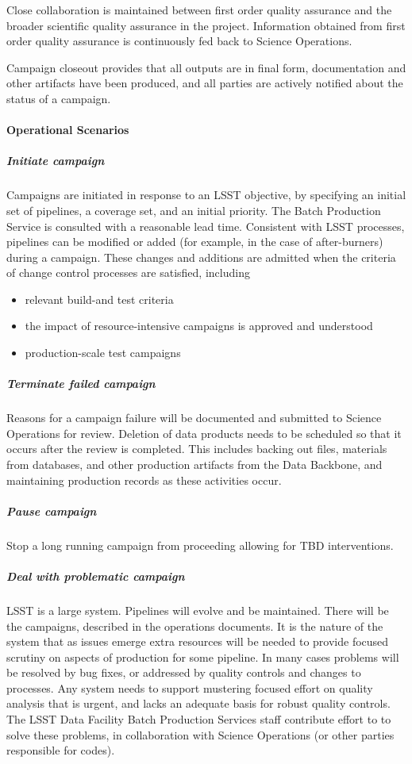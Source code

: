 Close collaboration is maintained between first order quality assurance and the
broader scientific quality assurance in the project. Information obtained from
first order quality assurance is continuously fed back to Science Operations.

Campaign closeout provides that all outputs are in final form, documentation and
other artifacts have been produced, and all parties are actively notified about
the status of a campaign.

\paragraph{Operational Scenarios}

\subparagraph{Initiate campaign}

Campaigns are initiated in response to an LSST objective, by specifying an
initial set of pipelines, a coverage set, and an initial priority. The Batch
Production Service is consulted with a reasonable lead time. Consistent with
LSST processes, pipelines can be modified or added (for example, in the case of
after-burners) during a campaign. These changes and additions are admitted when
the criteria of change control processes are satisfied, including

\begin{itemize}

\item relevant build-and test criteria

\item the impact of resource-intensive campaigns is approved and understood

\item production-scale test campaigns

\end{itemize}

\subparagraph{Terminate failed campaign}
Reasons for a campaign failure will be documented and submitted to Science
Operations for review. Deletion of data products needs to be scheduled so that
it occurs after the review is completed. This includes backing out files, materials
from databases, and other production artifacts from the Data Backbone, and
maintaining production records as these activities occur.

\subparagraph{Pause campaign}
Stop a long running campaign from proceeding allowing for TBD interventions.

\subparagraph{Deal with problematic campaign}
LSST is a large system. Pipelines will evolve and be maintained. There will be
the campaigns, described in the operations documents. It is the nature of the
system that as issues emerge extra resources will be needed to provide focused
scrutiny on aspects of production for some pipeline. In many cases problems will
be resolved by bug fixes, or addressed by quality controls and changes to
processes. Any system needs to support mustering focused effort on quality
analysis that is urgent, and lacks an adequate basis for robust quality controls.
The LSST Data Facility Batch Production Services staff contribute effort to to solve
these problems, in collaboration with Science Operations (or other parties
responsible for codes).

